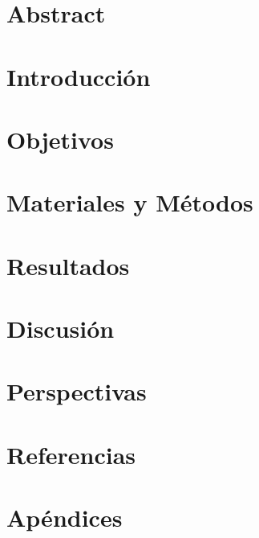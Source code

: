 \documentclass[12pt]{article}
\begin{document}
\newpage
\section*{Abstract}

\newpage
\section{Introducción}


\newpage
\section{Objetivos}

\newpage
\section{Materiales y Métodos}


\newpage
\section{Resultados}


\newpage
\section{Discusión}


\newpage
\section{Perspectivas}


\newpage
\section{Referencias}


\nocite{*}

\newpage
\section*{Apéndices}
\end{document}
